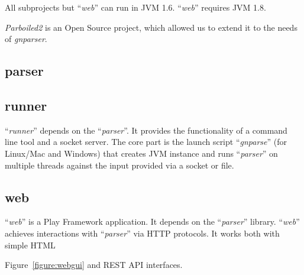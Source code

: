 \documentclass{bmcart}
\begin{document}
All subprojects but ``\textit{web}'' can run in JVM 1.6. ``\textit{web}''
requires JVM 1.8.

\textit{Parboiled2} is an Open Source project, which allowed us to extend
it to the needs of \textit{gnparser}.


\subsection*{parser}



\subsection*{runner}

``\textit{runner}'' depends on the ``\textit{parser}''. It provides the functionality
of a command line tool and a socket server. The core part is the launch script
``\textit{gnparse}'' (for Linux/Mac and Windows) that creates JVM
instance and runs ``\textit{parser}'' on multiple threads against the input
provided via a socket or file.

\subsection*{web}

``\textit{web}'' is a Play Framework \cite{wampler2011scala} application. It
depends on the ``\textit{parser}'' library. ``\textit{web}'' achieves
interactions with ``\textit{parser}'' via HTTP protocols. It works both with
simple HTML

Figure~\ref{figure:webgui} and REST API interfaces.
\end{document}
